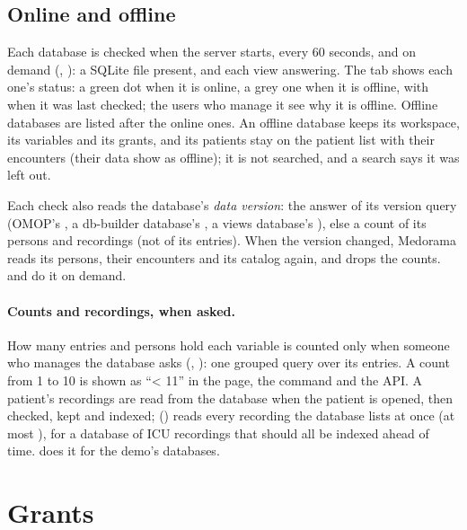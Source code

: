 \subsection{Online and offline}
\label{sec:administration-status}

Each database is checked when the server starts, every 60 seconds, and on demand (,
): a SQLite file present, and each view answering. The
 tab shows each one's status: a green dot when it is online, a grey one when it is
offline, with when it was last checked; the users who manage it see why it is offline. Offline
databases are listed after the online ones. An offline database keeps its workspace, its
variables and its grants, and its patients stay on the patient list with their encounters
(their data show as offline); it is not searched, and a search says it was left out.

Each check also reads the database's \emph{data version}: the answer of its version query (OMOP's
, a db-builder database's , a views database's
), else a count of its persons and recordings (not of its entries). When the
version changed, Medorama reads its persons, their encounters and its catalog again, and drops
the counts.  and  do it on demand.

\paragraph{Counts and recordings, when asked.} How many entries and persons hold each variable is
counted only when someone who manages the database asks (,
): one grouped query over its entries. A count from 1 to 10 is
shown as ``< 11'' in the page, the command and the API. A patient's recordings are read from the
database when the patient is opened, then checked, kept and indexed; 
() reads every recording the database lists at once (at most
), for a database of ICU recordings that should all be indexed ahead of time.
 does it for the demo's databases.

\section{Grants}
\label{sec:administration-grants}

